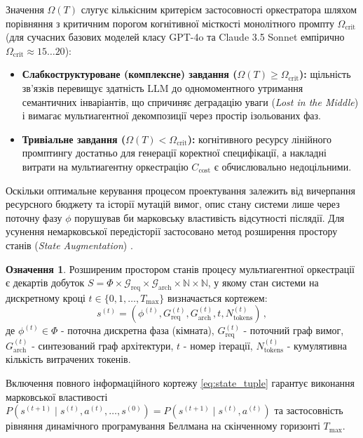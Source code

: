 \documentclass[12pt, reqno, a4paper]{amsart}
\theoremstyle{definition}
\newtheorem{defin}{Означення}
\theoremstyle{plain}
\theoremstyle{plain}
\theoremstyle{plain}
\theoremstyle{remark}
\theoremstyle{plain}
\begin{document}
{Значення $\Omega(T)$ слугує кількісним критерієм застосовності оркестратора шляхом порівняння з критичним порогом когнітивної місткості монолітного промпту $\Omega_{\text{crit}}$ (для сучасних базових моделей класу GPT-4o та Claude 3.5 Sonnet емпірично $\Omega_{\text{crit}} \approx 15 \dots 20$):
\begin{itemize}
\item[$\bullet$] \textbf{Слабкоструктуроване (комплексне) завдання ($\Omega(T) \ge \Omega_{\text{crit}}$):} щільність зв'язків перевищує здатність LLM до одномоментного утримання семантичних інваріантів, що спричиняє деградацію уваги (\textit{Lost in the Middle}) \cite{bib9} і вимагає мультиагентної декомпозиції через простір ізольованих фаз.
\item[$\bullet$] \textbf{Тривіальне завдання ($\Omega(T) < \Omega_{\text{crit}}$):} когнітивного ресурсу лінійного промптингу достатньо для генерації коректної специфікації, а накладні витрати на мультиагентну оркестрацію $C_{\text{cost}}$ є обчислювально недоцільними.
\end{itemize}

Оскільки оптимальне керування процесом проектування залежить від вичерпання ресурсного бюджету та історії мутацій вимог, опис стану системи лише через поточну фазу $\phi$ порушував би марковську властивість відсутності післядії. Для усунення немарковської передісторії застосовано метод розширення простору станів (\textit{State Augmentation}) \cite{bib5,bib23}.

\begin{defin}
\label{def:state}
Розширеним простором станів процесу мультиагентної оркестрації є декартів добуток $S = \Phi \times \mathcal{G}_{\text{req}} \times \mathcal{G}_{\text{arch}} \times \mathbb{N} \times \mathbb{N}$, у якому стан системи на дискретному кроці $t \in \{0, 1, \dots, T_{\max}\}$ визначається кортежем:
\begin{equation}
\label{eq:state_tuple}
s^{(t)} = \left(\phi^{(t)}, G_{\text{req}}^{(t)}, G_{\text{arch}}^{(t)}, t, N_{\text{tokens}}^{(t)}\right)\, ,
\end{equation}
де $\phi^{(t)} \in \Phi$ - поточна дискретна фаза (кімната), $G_{\text{req}}^{(t)}$ - поточний граф вимог, $G_{\text{arch}}^{(t)}$ - синтезований граф архітектури, $t$ - номер ітерації, $N_{\text{tokens}}^{(t)}$ - кумулятивна кількість витрачених токенів.
\end{defin}

Включення повного інформаційного кортежу \eqref{eq:state_tuple} гарантує виконання марковської властивості $P(s^{(t+1)} \mid s^{(t)}, a^{(t)}, \dots, s^{(0)}) = \allowbreak P(s^{(t+1)} \mid s^{(t)}, a^{(t)})$ та застосовність рівняння динамічного програмування Беллмана \cite{bib6} на скінченному горизонті $T_{\max}$.

}
\end{document}
